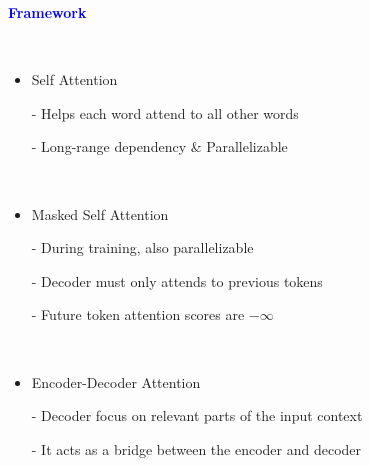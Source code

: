 \documentclass[professionalfont]{beamer}
\begin{document}
\begin{frame}

\begin{center}
    { \textbf{\textcolor{blue}{ {\fontsize{12}{14}\selectfont Framework} }} }
\end{center}
\\[0.2cm]

\begin{itemize}
    \item Self Attention

    - Helps each word attend to all other words

    - Long-range dependency \& Parallelizable

    \\[0.4cm]

    \item Masked Self Attention

    - During training, also parallelizable

    - Decoder must only attends to previous tokens

    - Future token attention scores are \( -\infty \)

    \\[0.4cm]

    \item Encoder-Decoder Attention

    - Decoder focus on relevant parts of the input context

    - It acts as a bridge between the encoder and decoder
\end{itemize}

\end{frame}
\end{document}
